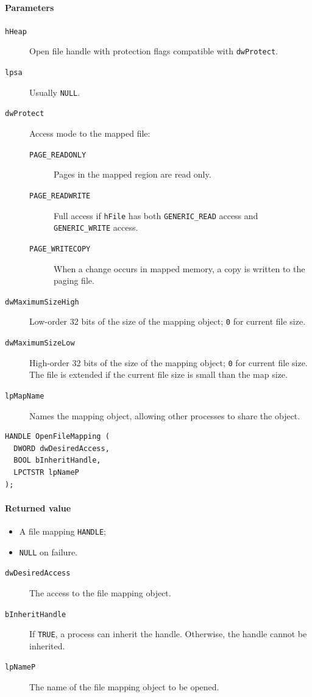 \paragraph{Parameters}
\begin{description}
\item [\texttt{hHeap}] Open file handle with protection flags compatible with \texttt{dwProtect}.
\item [\texttt{lpsa}] Usually \texttt{NULL}.
\item [\texttt{dwProtect}] Access mode to the mapped file:
\begin{description}
\item [\texttt{PAGE\_READONLY}] Pages in the mapped region are read only.
\item [\texttt{PAGE\_READWRITE}] Full access if \texttt{hFile} has both \texttt{GENERIC\_READ} access and \texttt{GENERIC\_WRITE} access.
\item [\texttt{PAGE\_WRITECOPY}] When a change occurs in mapped memory, a copy is written to the paging file.
\end{description}
\item [\texttt{dwMaximumSizeHigh}] Low-order 32 bits of the size of the mapping object; \texttt{0} for current file size.
\item [\texttt{dwMaximumSizeLow}] High-order 32 bits of the size of the mapping object; \texttt{0} for current file size. The file is extended if the current file size is small than the map size.
\item [\texttt{lpMapName}] Names the mapping object, allowing other processes to share the object.
\end{description}

\begin{verbatim}
HANDLE OpenFileMapping (
  DWORD dwDesiredAccess,
  BOOL bInheritHandle,
  LPCTSTR lpNameP
);
\end{verbatim}

\paragraph{Returned value}
\begin{itemize}
\item A file mapping \texttt{HANDLE};
\item \texttt{NULL} on failure.
\end{itemize}

\begin{description}
\item [\texttt{dwDesiredAccess}] The access to the file mapping object.
\item [\texttt{bInheritHandle}] If \texttt{TRUE}, a process can inherit the handle. Otherwise, the handle cannot be inherited.
\item [\texttt{lpNameP}] The name of the file mapping object to be opened.
\end{description}

